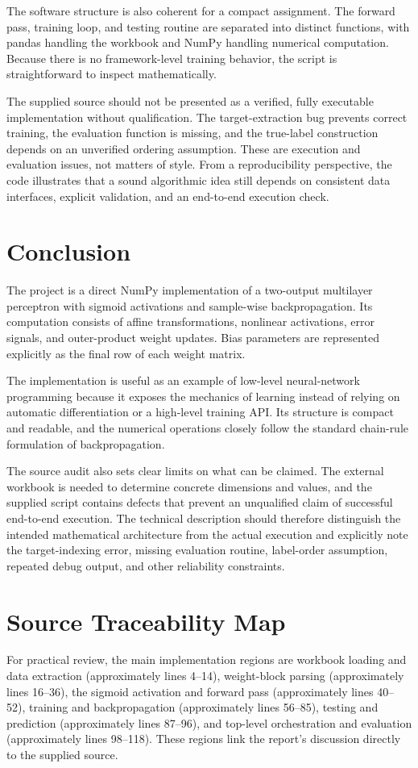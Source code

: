 \documentclass[11pt,a4paper]{article}
\begin{document}
The software structure is also coherent for a compact assignment. The forward pass, training loop, and testing routine are separated into distinct functions, with pandas handling the workbook and NumPy handling numerical computation. Because there is no framework-level training behavior, the script is straightforward to inspect mathematically.

The supplied source should not be presented as a verified, fully executable implementation without qualification. The target-extraction bug prevents correct training, the evaluation function is missing, and the true-label construction depends on an unverified ordering assumption. These are execution and evaluation issues, not matters of style. From a reproducibility perspective, the code illustrates that a sound algorithmic idea still depends on consistent data interfaces, explicit validation, and an end-to-end execution check.

\section{Conclusion}
The project is a direct NumPy implementation of a two-output multilayer perceptron with sigmoid activations and sample-wise backpropagation. Its computation consists of affine transformations, nonlinear activations, error signals, and outer-product weight updates. Bias parameters are represented explicitly as the final row of each weight matrix.

The implementation is useful as an example of low-level neural-network programming because it exposes the mechanics of learning instead of relying on automatic differentiation or a high-level training API. Its structure is compact and readable, and the numerical operations closely follow the standard chain-rule formulation of backpropagation.

The source audit also sets clear limits on what can be claimed. The external workbook is needed to determine concrete dimensions and values, and the supplied script contains defects that prevent an unqualified claim of successful end-to-end execution. The technical description should therefore distinguish the intended mathematical architecture from the actual execution and explicitly note the target-indexing error, missing evaluation routine, label-order assumption, repeated debug output, and other reliability constraints.

\section*{Source Traceability Map}
For practical review, the main implementation regions are workbook loading and data extraction (approximately lines 4--14), weight-block parsing (approximately lines 16--36), the sigmoid activation and forward pass (approximately lines 40--52), training and backpropagation (approximately lines 56--85), testing and prediction (approximately lines 87--96), and top-level orchestration and evaluation (approximately lines 98--118). These regions link the report's discussion directly to the supplied source.
\end{document}
